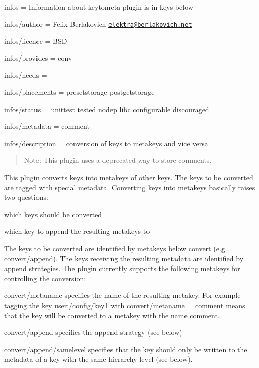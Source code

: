 
\begin{DoxyItemize}
\item infos = Information about keytometa plugin is in keys below
\item infos/author = Felix Berlakovich \href{mailto:elektra@berlakovich.net}{\tt elektra@berlakovich.\+net}
\item infos/licence = B\+SD
\item infos/provides = conv
\item infos/needs =
\item infos/placements = presetstorage postgetstorage
\item infos/status = unittest tested nodep libc configurable discouraged
\item infos/metadata = comment
\item infos/description = conversion of keys to metakeys and vice versa
\end{DoxyItemize}

\begin{quote}
Note\+: This plugin uses a deprecated way to store comments. \end{quote}


This plugin converts keys into metakeys of other keys. The keys to be converted are tagged with special metadata. Converting keys into metakeys basically raises two questions\+:


\begin{DoxyItemize}
\item which keys should be converted
\item which key to append the resulting metakeys to
\end{DoxyItemize}

The keys to be converted are identified by metakeys below {\ttfamily convert} (e.\+g. {\ttfamily convert/append}). The keys receiving the resulting metadata are identified by append strategies. The plugin currently supports the following metakeys for controlling the conversion\+:


\begin{DoxyItemize}
\item {\ttfamily convert/metaname} specifies the name of the resulting metakey. For example tagging the key {\ttfamily user\+:/config/key1} with {\ttfamily convert/metaname = comment} means that the key will be converted to a metakey with the name {\ttfamily comment}.
\item {\ttfamily convert/append} specifies the append strategy (see below)
\item {\ttfamily convert/append/samelevel} specifies that the key should only be written to the metadata of a key with the same hierarchy level (see below).
\end{DoxyItemize}

